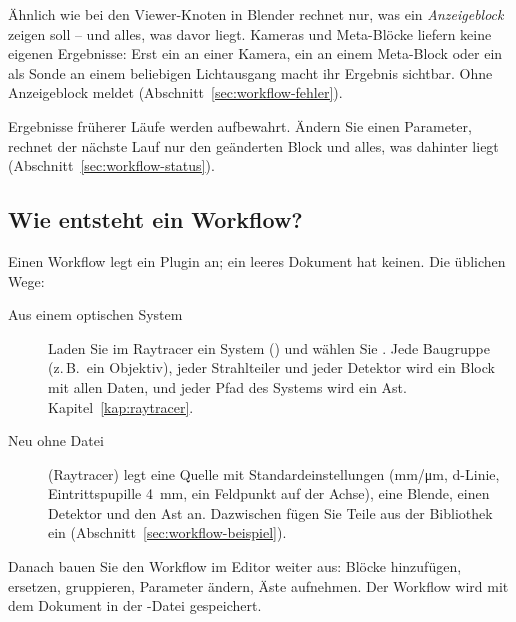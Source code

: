 Ähnlich wie bei den Viewer-Knoten in Blender rechnet  nur, was ein
\emph{Anzeigeblock} zeigen soll – und alles, was davor liegt. Kameras und Meta-Blöcke liefern
keine eigenen Ergebnisse: Erst ein  an einer Kamera, ein
 an einem Meta-Block oder ein  als Sonde an einem
beliebigen Lichtausgang macht ihr Ergebnis sichtbar. Ohne Anzeigeblock meldet 
 (Abschnitt~\ref{sec:workflow-fehler}).

Ergebnisse früherer Läufe werden aufbewahrt. Ändern Sie einen Parameter, rechnet der nächste
Lauf nur den geänderten Block und alles, was dahinter liegt (Abschnitt~\ref{sec:workflow-status}).

\subsection{Wie entsteht ein Workflow?}\label{sec:workflow-entstehen}

Einen Workflow legt ein Plugin an; ein leeres Dokument hat keinen. Die üblichen Wege:

\begin{description}
  \item[Aus einem optischen System] Laden Sie im Raytracer ein System () und
        wählen Sie . Jede Baugruppe (z.\,B.\ ein Objektiv), jeder
        Strahlteiler und jeder Detektor wird ein Block mit allen Daten, und jeder Pfad des
        Systems wird ein Ast. Kapitel~\ref{kap:raytracer}.
  \item[Neu ohne Datei]  (Raytracer) legt eine Quelle mit
        Standardeinstellungen (mm/\si{\micro\metre}, d-Linie, Eintrittspupille 4~mm, ein
        Feldpunkt auf der Achse), eine Blende, einen Detektor und den Ast  an.
        Dazwischen fügen Sie Teile aus der Bibliothek ein (Abschnitt~\ref{sec:workflow-beispiel}).
\end{description}

Danach bauen Sie den Workflow im Editor weiter aus: Blöcke hinzufügen, ersetzen, gruppieren,
Parameter ändern, Äste aufnehmen. Der Workflow wird mit dem Dokument in der
-Datei gespeichert.

